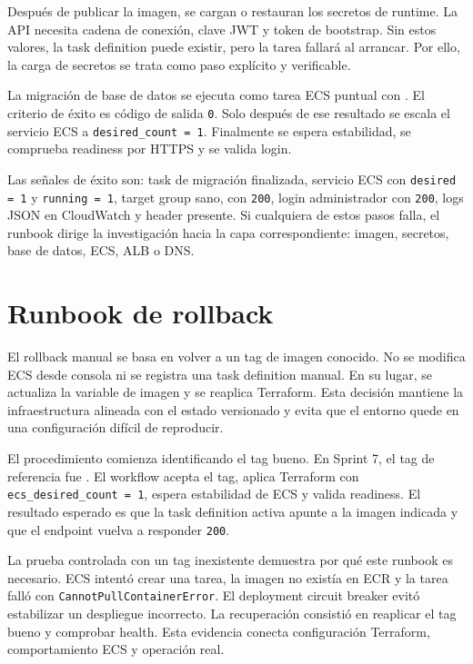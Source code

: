Después de publicar la imagen, se cargan o restauran los secretos de runtime. La API necesita cadena de conexión, clave JWT y token de bootstrap. Sin estos valores, la task definition puede existir, pero la tarea fallará al arrancar. Por ello, la carga de secretos se trata como paso explícito y verificable.

La migración de base de datos se ejecuta como tarea ECS puntual con . El criterio de éxito es código de salida \texttt{0}. Solo después de ese resultado se escala el servicio ECS a \texttt{desired\_count = 1}. Finalmente se espera estabilidad, se comprueba readiness por HTTPS y se valida login.

Las señales de éxito son: task de migración finalizada, servicio ECS con \texttt{desired = 1} y \texttt{running = 1}, target group sano,  con \texttt{200}, login administrador con \texttt{200}, logs JSON en CloudWatch y header  presente. Si cualquiera de estos pasos falla, el runbook dirige la investigación hacia la capa correspondiente: imagen, secretos, base de datos, ECS, ALB o DNS.

\section{Runbook de rollback}
\label{sec:runbook-rollback}

El rollback manual se basa en volver a un tag de imagen conocido. No se modifica ECS desde consola ni se registra una task definition manual. En su lugar, se actualiza la variable de imagen y se reaplica Terraform. Esta decisión mantiene la infraestructura alineada con el estado versionado y evita que el entorno quede en una configuración difícil de reproducir.

El procedimiento comienza identificando el tag bueno. En Sprint 7, el tag de referencia fue . El workflow  acepta el tag, aplica Terraform con \texttt{ecs\_desired\_count = 1}, espera estabilidad de ECS y valida readiness. El resultado esperado es que la task definition activa apunte a la imagen indicada y que el endpoint vuelva a responder \texttt{200}.

La prueba controlada con un tag inexistente demuestra por qué este runbook es necesario. ECS intentó crear una tarea, la imagen no existía en ECR y la tarea falló con \texttt{CannotPullContainerError}. El deployment circuit breaker evitó estabilizar un despliegue incorrecto. La recuperación consistió en reaplicar el tag bueno y comprobar health. Esta evidencia conecta configuración Terraform, comportamiento ECS y operación real.

